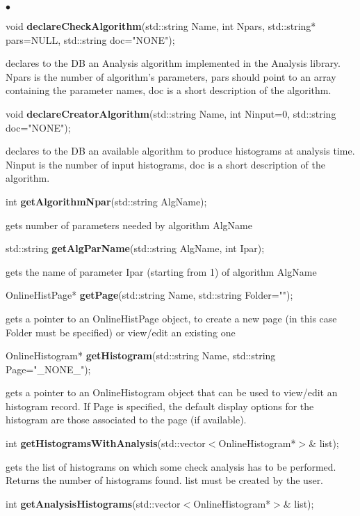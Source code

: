 \documentclass{lhcbnote}
\begin{document}
\begin{list}{$\bullet$}{}
\item   void {\bf declareCheckAlgorithm}(std::string Name, 
			     int Npars, 
			     std::string* pars=NULL, 
			     std::string doc="NONE");

declares to the DB an Analysis algorithm implemented in the Analysis
library. Npars is the number of algorithm's parameters, pars should
point to an array containing the parameter names, doc is a short
description of the algorithm.

\item  void {\bf declareCreatorAlgorithm}(std::string Name, 
			       int Ninput=0, 
			       std::string doc="NONE");

declares to the DB an available algorithm to produce histograms at
analysis time. Ninput is the number of input histograms, doc is a short
description of the algorithm.


\item  int {\bf getAlgorithmNpar}(std::string AlgName);

gets number of parameters needed by algorithm AlgName


\item std::string {\bf getAlgParName}(std::string AlgName,
		       int Ipar);

gets the name of parameter Ipar (starting from 1) of algorithm AlgName

\item  OnlineHistPage* {\bf getPage}(std::string Name, std::string Folder="");

gets a pointer to an OnlineHistPage object, to create a new page (in this case
Folder must be specified) or view/edit an existing one


\item  OnlineHistogram* {\bf getHistogram}(std::string Name,
				std::string Page="\_NONE\_");

gets a pointer to an OnlineHistogram object
that can be used to view/edit an histogram record. If Page
is specified, the default display options for the histogram are those
associated to the page (if available). 


\item int {\bf getHistogramsWithAnalysis}(std::vector$<$OnlineHistogram*$>$\&
list);

gets the list of histograms on which some check analysis has to be
performed. Returns the number of histograms found. list must be
created by the user.

\item int {\bf getAnalysisHistograms}(std::vector$<$OnlineHistogram*$>$\& list);


\end{list}
\end{document}
